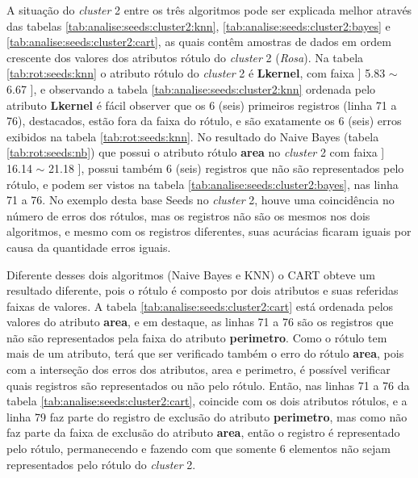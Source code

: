 \begin{table}[!ht]
    
 \label{tab:analise:seeds:cluster1}
\end{table}

A situação do \textit{cluster} 2 entre os três algoritmos pode ser explicada melhor através das tabelas \ref{tab:analise:seeds:cluster2:knn}, \ref{tab:analise:seeds:cluster2:bayes} e \ref{tab:analise:seeds:cluster2:cart}, as quais contêm amostras de dados em ordem crescente dos valores dos atributos rótulo  do \textit{cluster} 2 (\textit{Rosa}). Na tabela \ref{tab:rot:seeds:knn} o atributo rótulo do \textit{cluster} 2 é \textbf{Lkernel}, com faixa ] 5.83 $\sim$ 6.67 ], e observando a tabela \ref{tab:analise:seeds:cluster2:knn} ordenada pelo atributo \textbf{Lkernel} é fácil observer que os 6 (seis) primeiros registros (linha 71 a 76), destacados, estão fora da faixa do rótulo, e são exatamente os 6 (seis) erros exibidos na tabela \ref{tab:rot:seeds:knn}.
No resultado do Naive Bayes (tabela \ref{tab:rot:seeds:nb}) que possui o atributo rótulo \textbf{area} no \textit{cluster} 2 com faixa ] 16.14 $\sim$  21.18 ], possui também 6 (seis) registros que não são representados pelo rótulo, e podem ser vistos na tabela \ref{tab:analise:seeds:cluster2:bayes}, nas linha 71 a 76. No exemplo desta base Seeds no \textit{cluster} 2, houve uma coincidência no número de erros dos rótulos, mas os registros não são os mesmos nos dois algoritmos, e mesmo com os registros diferentes, suas acurácias ficaram iguais por causa da quantidade erros iguais.

Diferente desses dois algoritmos (Naive Bayes e KNN) o CART obteve um resultado diferente, pois o rótulo é composto por dois atributos e suas referidas faixas de valores. A tabela \ref{tab:analise:seeds:cluster2:cart} está ordenada pelos valores do atributo \textbf{area}, e em destaque, as linhas 71 a 76 são os registros que não são representados pela faixa do atributo \textbf{perimetro}.  Como o rótulo tem mais de um atributo, terá que ser verificado também o erro do rótulo \textbf{area}, pois com  a interseção dos erros dos atributos, area e perimetro, é possível verificar quais registros são representados ou não pelo rótulo. Então, nas linhas 71 a 76 da tabela \ref{tab:analise:seeds:cluster2:cart}, coincide com os dois atributos rótulos, e a linha 79 faz parte do registro de exclusão do atributo \textbf{perimetro}, mas como não faz parte da faixa de exclusão do atributo \textbf{area}, então o registro é representado pelo rótulo, permanecendo e fazendo com que somente 6 elementos não sejam representados pelo rótulo do \textit{cluster} 2.

